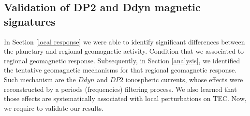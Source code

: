 \documentclass[a4paper,fleqn]{cas-dc}
\begin{document}



\subsection{Validation of DP2 and Ddyn magnetic signatures}
\label{validation}

In Section \ref{local response} we were able to identify significant differences between the planetary and regional geomagnetic activity. Condition that we associated to regional geomagnetic response. Subsequently, in Section \ref{analysis}, we identified the tentative geomagnetic mechanisms for that regional geomagnetic response. Such mechanism are the $Ddyn$ and $DP2$ ionospheric currents, whose effects were reconstructed by a periods (frequencies) filtering process. We also learned that those effects are systematically associated with local perturbations on TEC. Now, we require to validate our results.
\end{document}
